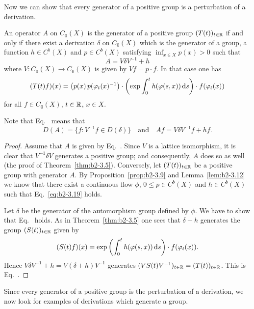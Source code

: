 Now we can show that every generator of a positive group is a perturbation of a derivation.
\begin{theorem}\label{thm:b2-3.14}
An operator $A$ on $C_{0}(X)$ is the generator of a positive group $(T(t))_{t \in \mathbb{R}}$ if and only if there exist a derivation $\delta$ on $C_{0}(X)$ which is the generator of a group, a function $h \in C^{b}(X)$ and $p \in C^{b}(X)$ satisfying $\inf_{x \in X} p(x) > 0$ such that
\begin{equation}\label{eq:b2-3.18}
A = V\delta V^{-1} + h
\end{equation}
where $V \colon C_{0}(X) \to C_{0}(X)$ is given by $Vf = p \cdot f$. In that case one has
\begin{equation}\label{eq:b2-3.19}
(T(t)f)(x) = \mleft( p(x) \, p(\phi_{t}(x)^{-1} \mright) \cdot 
\mleft(\exp \int_{0}^{t} h(\phi(s,x)) \ds \mright) \cdot f(\phi_{t}(x))
\end{equation}
for all $f \in C_{0}(X)$, $t \in \mathbb{R}$, $x \in X$.
\end{theorem}
Note that  Eq.~ means that 
%
\[
	D(A) = \{ f \colon V^{-1}f \in D(\delta) \}
	\quad \text{and} \quad
	Af = V\delta V^{-1}f + hf .
\]
\begin{proof}
Assume that $A$ is given by Eq.~.
Since $V$ is a lattice isomorphism, it is clear that $V^{-1}\delta V$ generates a positive group; and consequently, $A$ does so as well (\cf the proof of Theorem~\ref{thm:b2-3.5}).
Conversely, let $(T(t))_{t \in \mathbb{R}}$ be a positive group with generator $A$.
By Proposition~\ref{prop:b2-3.9} and Lemma~\ref{lem:b2-3.12} we know that there exist a continuous flow $\phi$, $0 \leq  p \in C^{b}(X)$ and $h \in C^{b}(X)$ such that Eq.~\eqref{eq:b2-3.19} holds.

Let $\delta$ be the generator of the automorphism group defined by $\phi$.
We have to show that Eq.~ holds.
As in Theorem~\ref{thm:b2-3.5} one sees that $\delta + h$ generates the group $(S(t))_{t \in \mathbb{R}}$ given by 
\[
(S(t)f)(x) = \exp\left(\int_{0}^{t} h(\phi(s,x)) \ds \right) \cdot f(\phi_{t}(x)).
\]
Hence $V\delta V^{-1} + h = V(\delta + h)V^{-1}$ generates $(VS(t)V^{-1})_{t \in \mathbb{R}} = (T(t))_{t \in \mathbb{R}}$.
This is Eq.~.
\end{proof}
Since every generator of a positive group is the perturbation of a derivation, we now look for examples of derivations which generate a group.

